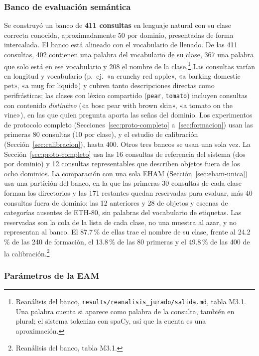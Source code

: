 \subsubsection{Banco de evaluación semántica}
\label{sec:banco}

Se construyó un banco de \textbf{411 consultas} en lenguaje natural con su clase
correcta conocida, aproximadamente 50 por dominio,
presentadas de forma intercalada.
El banco está alineado con el vocabulario de llenado.
De las 411 consultas, 402 contienen una palabra del vocabulario de su clase, 367 una
palabra que solo está en ese vocabulario y 208 el nombre de la clase.\footnote{Reanálisis
del banco, \texttt{results/reanalisis\_jurado/salida.md}, tabla M3.1. Una palabra cuenta
si aparece como palabra de la consulta, también en plural; el sistema tokeniza con
spaCy, así que la cuenta es una aproximación.}
Las consultas varían en longitud y vocabulario (p.\ ej.\ «a crunchy red apple»,
«a barking domestic pet», «a mug for liquid») y cubren tanto descripciones
directas como perifrásticas; las clases con léxico compartido (\texttt{pear},
\texttt{tomato}) incluyen consultas con contenido \emph{distintivo}
(«a bosc pear with brown skin», «a tomato on the vine»), en las que quien pregunta
aporta las señas del dominio.
Los experimentos de protocolo completo (Secciones~\ref{sec:proto-completo}
a~\ref{sec:formacion}) usan las primeras 80 consultas (10 por clase), y el estudio de
calibración (Sección~\ref{sec:calibracion}), hasta 400.
Otros tres bancos se usan una sola vez.
La Sección~\ref{sec:proto-completo} usa las 16 consultas de referencia del sistema (dos
por dominio) y 12 consultas representables que describen objetos fuera de los ocho
dominios.
La comparación con una sola EHAM (Sección~\ref{sec:eham-unica}) usa una partición del
banco, en la que las primeras 30 consultas de cada clase forman los directorios y las 171
restantes quedan reservadas para evaluar, más 40 consultas fuera de dominio: las 12
anteriores y 28 de objetos y escenas de categorías ausentes de ETH-80, sin palabras del
vocabulario de etiquetas.
Las reservadas son la cola de la lista de cada clase, no una muestra al azar, y no
representan al banco.
El 87.7\,\% de ellas trae el nombre de su clase, frente al 24.2\,\% de las 240 de
formación, el 13.8\,\% de las 80 primeras y el 49.8\,\% de las 400 de la
calibración.\footnote{Reanálisis del banco, tabla M3.1.}

\subsubsection{Parámetros de la EAM}
\label{sec:parametros}

